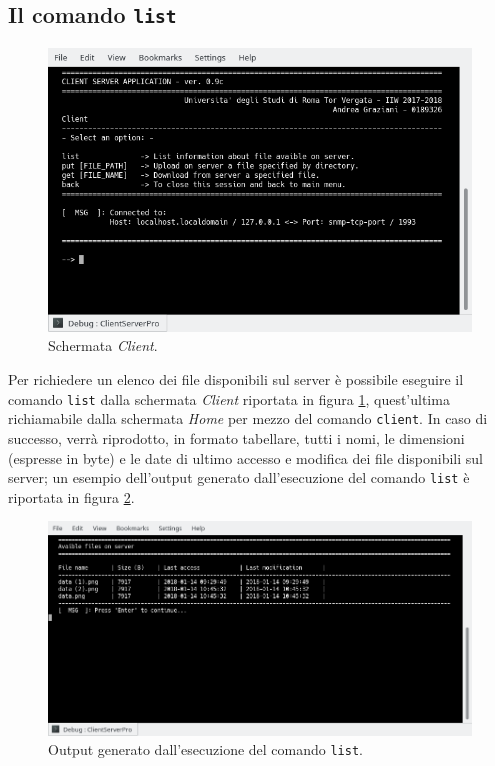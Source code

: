 \documentclass[10pt,a4paper, titlepage]{report}
\begin{document}
\newpage
\subsection{Il comando \texttt{list}}\label{sec:list-command}

\begin{figure}
\centering
\includegraphics[width=\textwidth]{Client}
\caption{Schermata \textit{Client}.}
\label{fig:Client}
\end{figure}


Per richiedere un elenco dei file disponibili sul server è possibile eseguire il comando \texttt{list} dalla schermata \textit{Client} riportata in figura \ref{fig:Client}, quest'ultima richiamabile dalla schermata \textit{Home} per mezzo del comando \texttt{client}. In caso di successo, verrà riprodotto, in formato tabellare, tutti i nomi, le dimensioni (espresse in byte) e le date di ultimo accesso e modifica dei file disponibili sul server; un esempio dell'output generato dall'esecuzione del comando \texttt{list} è riportata in figura \ref{fig:List}.

\begin{figure}
\centering
\includegraphics[width=\textwidth]{List}
\caption{Output generato dall'esecuzione del comando \texttt{list}.}
\label{fig:List}
\end{figure}
\end{document}
